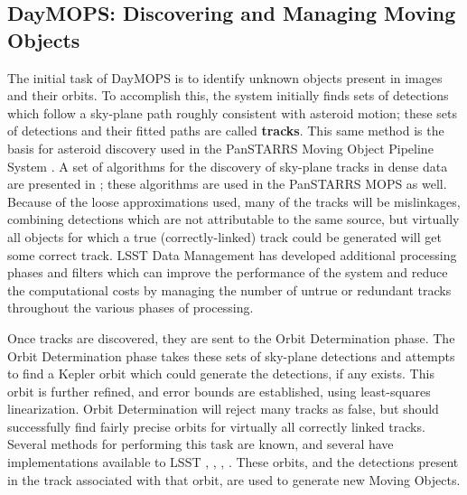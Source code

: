 \documentclass[12pt,preprint]{aastex}
\begin{document}
\subsection{DayMOPS: Discovering and Managing Moving Objects}



The initial task of DayMOPS is to identify unknown objects present in
images and their orbits.  To accomplish this, the system initially
finds sets of detections which follow a sky-plane path roughly
consistent with asteroid motion; these sets of detections and their
fitted paths are called \textbf{tracks}.  This same method is the
basis for asteroid discovery used in the PanSTARRS Moving Object
Pipeline System \citep{psMOPSDesign}.  A set of algorithms for the
discovery of sky-plane tracks in dense data are presented in
\citet{Kubica:2005:MTA:1081870.1081889}; these algorithms are used in
the PanSTARRS MOPS as well.  Because of the loose approximations used,
many of the tracks will be mislinkages, combining detections which are
not attributable to the same source, but virtually all objects for
which a true (correctly-linked) track could be generated will get some
correct track.  LSST Data Management has developed additional
processing phases and filters which can improve the performance of the
system and reduce the computational costs by managing the number of
untrue or redundant tracks throughout the various phases of
processing.


Once tracks are discovered, they are sent to the Orbit Determination
phase. The Orbit Determination phase takes these sets of sky-plane
detections and attempts to find a Kepler orbit which could generate
the detections, if any exists.  This orbit is further refined, and
error bounds are established, using least-squares linearization.
Orbit Determination will reject many tracks as false, but should
successfully find fairly precise orbits for virtually all correctly
linked tracks.  Several methods for performing this task are known,
and several have implementations available to LSST
\citep{Milani04orbitdetermination}, \citep{Milani2006},
\citep{OpenOrb2009}, \citep{granvik_thesis}.  These orbits, and the
detections present in the track associated with that orbit, are used
to generate new Moving Objects.
\end{document}
